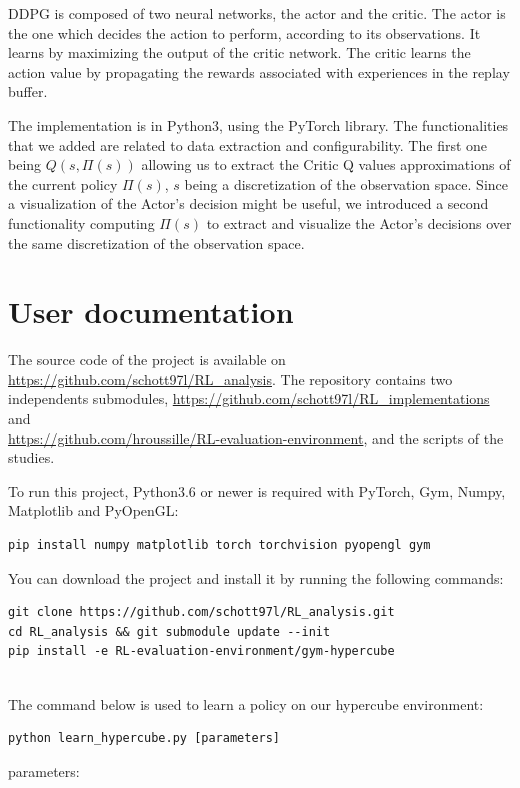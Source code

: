 \documentclass{article}
\begin{document}
DDPG is composed of two neural networks, the actor and the critic. The actor is the one which decides the action to perform, according to its observations. It learns by maximizing the output of the critic network. The critic learns the action value by propagating the rewards associated with experiences in the replay buffer.

The implementation is in Python3, using the PyTorch library. The functionalities that we added are related to data extraction and configurability. The first one being $Q(s, \Pi(s))$ allowing us to extract the Critic Q values approximations of the current policy $\Pi(s)$, $s$ being a discretization of the observation space. Since a visualization of the Actor's decision might be useful, we introduced a second functionality computing $\Pi(s)$ to extract and visualize the Actor's decisions over the same discretization of the observation space.

\section{User documentation}

The source code of the project is available on \url{https://github.com/schott97l/RL_analysis}.
The repository contains two independents submodules, \url{https://github.com/schott97l/RL_implementations} and\\ \url{https://github.com/hroussille/RL-evaluation-environment}, and the scripts of the studies.

To run this project, Python3.6 or newer is required with PyTorch, Gym, Numpy, Matplotlib and PyOpenGL:
\begin{lstlisting}
pip install numpy matplotlib torch torchvision pyopengl gym 
\end{lstlisting}

You can download the project and install it by running the following commands:
\begin{lstlisting}
git clone https://github.com/schott97l/RL_analysis.git
cd RL_analysis && git submodule update --init
pip install -e RL-evaluation-environment/gym-hypercube
\end{lstlisting}
\ \\

The command below is used to learn a policy on our hypercube environment:
\begin{lstlisting}
python learn_hypercube.py [parameters]
\end{lstlisting}

parameters:
\end{document}
